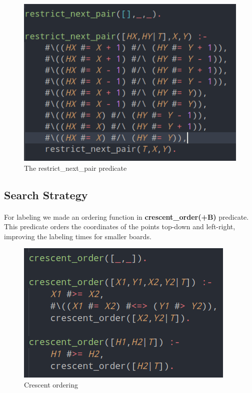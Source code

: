 \documentclass[runningheads]{llncs}
\begin{document}
\begin{figure}
    \begin{center}
        \includegraphics[scale=0.5]{images/restrictPair.png}
        \caption{The restrict\_next\_pair predicate} \label{fig3}
    \end{center}
\end{figure}

\subsection{Search Strategy}
\paragraph{}
For labeling we made an ordering function in \textbf{crescent\_order(+B)} predicate. This predicate orders the coordinates of the points
top-down and left-right, improving the labeling times for smaller boards.

\begin{figure}
    \begin{center}
        \includegraphics[scale=0.5]{images/crescent.png}
        \caption{Crescent ordering} \label{fig4}
    \end{center}
\end{figure}
\end{document}
